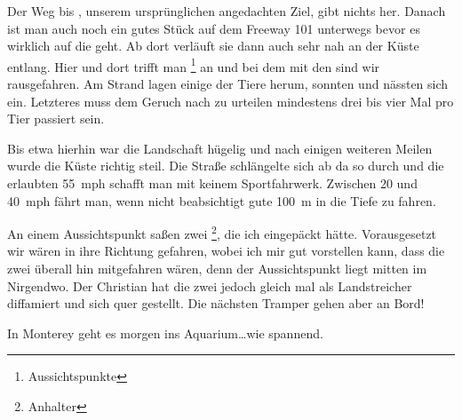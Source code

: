 Der Weg bis , unserem ursprünglichen angedachten Ziel, gibt nichts her.
Danach ist man auch noch ein gutes Stück auf dem Freeway 101 unterwegs bevor es wirklich auf die  geht.
Ab dort verläuft sie dann auch sehr nah an der Küste entlang.
Hier und dort trifft man \footnote{Aussichtspunkte} an und bei dem mit den  sind wir rausgefahren.
Am Strand lagen einige der Tiere herum, sonnten und nässten sich ein.
Letzteres muss dem Geruch nach zu urteilen mindestens drei bis vier Mal pro Tier passiert sein.

\newpage
\thispagestyle{empty}
\newpage


Bis etwa hierhin war die Landschaft hügelig und nach einigen weiteren Meilen wurde die Küste richtig steil.
Die Straße schlängelte sich ab da so durch und die erlaubten 55~mph schafft man mit keinem Sportfahrwerk.
Zwischen 20 und 40~mph fährt man, wenn nicht beabsichtigt gute 100~m in die Tiefe zu \glqq fahren\grqq.

An einem Aussichtspunkt saßen zwei \footnote{Anhalter}, die ich eingepäckt hätte.
Vorausgesetzt wir wären in ihre Richtung gefahren, wobei ich mir gut vorstellen kann, dass die zwei überall hin mitgefahren wären, denn der Aussichtspunkt liegt mitten im Nirgendwo.
Der Christian hat die zwei jedoch gleich mal als Landstreicher diffamiert und sich quer gestellt.
Die nächsten Tramper gehen aber an Bord!

In Monterey geht es morgen ins Aquarium\dots wie spannend.
